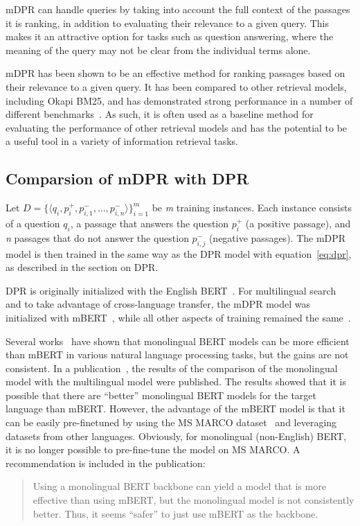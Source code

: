 mDPR can handle queries by taking into account the full context of the passages it is ranking, in addition to evaluating their relevance to a given query. This makes it an attractive option for tasks such as question answering, where the meaning of the query may not be clear from the individual terms alone.

mDPR has been shown to be an effective method for ranking passages based on their relevance to a given query. It has been compared to other retrieval models, including Okapi BM25, and has demonstrated strong performance in a number of different benchmarks~\cite{BM25}. As such, it is often used as a baseline method for evaluating the performance of other retrieval models and has the potential to be a useful tool in a variety of information retrieval tasks.

\subsection*{Comparsion of mDPR with DPR}
Let $D = \{\langle q_i, p_i^+, p_{i,1}^-, \dots , p_{i,n}^-\rangle\}_{i=1}^m$ be \emph{m} training instances. Each instance consists of a question $q_i$, a passage that answers the question $p_i^+$ (a positive passage),
and \emph{n} passages that do not answer the question $p_{i,j}^-$ (negative passages). The mDPR model is then trained in the same way as the DPR model with equation~\ref{eq:dpr}, as described in the section on DPR.

DPR is originally initialized with the English BERT~\cite{bert}. For multilingual search and to take advantage of cross-language transfer, the mDPR model was initialized with mBERT~\cite{mbert}, while all other aspects of training remained the same~\cite{mDPR_training}.

Several works~\cite{mdpr_ref1}\cite{mdpr_ref2}\cite{mdpr_ref3}\cite{mdpr_ref4} have shown that monolingual BERT models can be more efficient than mBERT in various natural language processing tasks, but the gains are not consistent. In a publication~\cite{mDPR_training}, the results of the comparison of the monolingual model with the multilingual model were published. The results showed that it is possible that there are ``better'' monolingual BERT models for the target language than mBERT. However, the advantage of the mBERT model is that it can be easily pre-finetuned by using the MS MARCO dataset~\cite{msmarco} and leveraging datasets from other languages.  Obviously, for monolingual (non-English) BERT, it is no longer possible to pre-fine-tune the model on MS MARCO. A recommendation is included in the publication:
\begin{quotation}
    Using a monolingual BERT backbone can yield a model that is more effective than using mBERT, but the monolingual model is not consistently better. Thus, it seems “safer” to just use mBERT as the backbone. \cite{mDPR_training}
\end{quotation}

